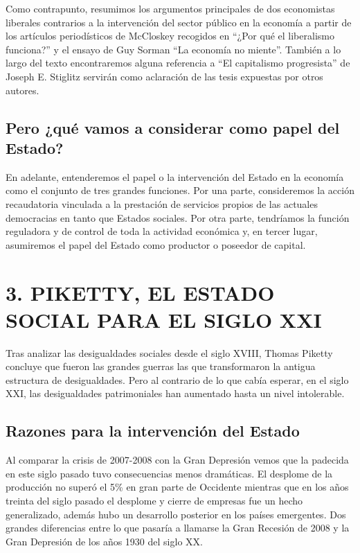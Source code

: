 \documentclass[
]{article}
\begin{document}
Como contrapunto, resumimos los argumentos principales de dos
economistas liberales contrarios a la intervención del sector público en
la economía a partir de los artículos periodísticos de McCloskey
recogidos en ``¿Por qué el liberalismo funciona?'' y el ensayo de Guy
Sorman ``La economía no miente''. También a lo largo del texto
encontraremos alguna referencia a ``El capitalismo progresista'' de
Joseph E. Stiglitz servirán como aclaración de las tesis expuestas por
otros autores.

\hypertarget{pero-quuxe9-vamos-a-considerar-como-papel-del-estado}{%
\subsection{Pero ¿qué vamos a considerar como papel del
Estado?}\label{pero-quuxe9-vamos-a-considerar-como-papel-del-estado}}

En adelante, entenderemos el papel o la intervención del Estado en la
economía como el conjunto de tres grandes funciones. Por una parte,
consideremos la acción recaudatoria vinculada a la prestación de
servicios propios de las actuales democracias en tanto que Estados
sociales. Por otra parte, tendríamos la función reguladora y de control
de toda la actividad económica y, en tercer lugar, asumiremos el papel
del Estado como productor o poseedor de capital.

\hypertarget{piketty-el-estado-social-para-el-siglo-xxi}{%
\section{3. PIKETTY, EL ESTADO SOCIAL PARA EL SIGLO
XXI}\label{piketty-el-estado-social-para-el-siglo-xxi}}

Tras analizar las desigualdades sociales desde el siglo XVIII, Thomas
Piketty concluye que fueron las grandes guerras las que transformaron la
antigua estructura de desigualdades. Pero al contrario de lo que cabía
esperar, en el siglo XXI, las desigualdades patrimoniales han aumentado
hasta un nivel intolerable.

\hypertarget{razones-para-la-intervenciuxf3n-del-estado}{%
\subsection{Razones para la intervención del
Estado}\label{razones-para-la-intervenciuxf3n-del-estado}}

Al comparar la crisis de 2007-2008 con la Gran Depresión vemos que la
padecida en este siglo pasado tuvo consecuencias menos dramáticas. El
desplome de la producción no superó el 5\% en gran parte de Occidente
mientras que en los años treinta del siglo pasado el desplome y cierre
de empresas fue un hecho generalizado, además hubo un desarrollo
posterior en los países emergentes. Dos grandes diferencias entre lo que
pasaría a llamarse la Gran Recesión de 2008 y la Gran Depresión de los
años 1930 del siglo XX.
\end{document}
